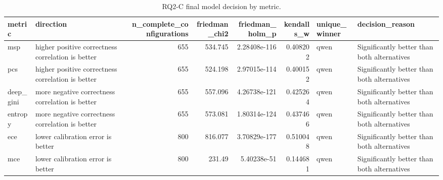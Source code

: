 \begin{table}[tbp]
\caption{RQ2-C final model decision by metric.}
\label{tab:rq2c-final-metric-decisions}
\begin{tabular}{llrrrrll}
\toprule
metric & direction & n\_complete\_configurations & friedman\_chi2 & friedman\_holm\_p & kendalls\_w & unique\_winner & decision\_reason \\
\midrule
msp & higher positive correctness correlation is better & 655 & 534.745 & 2.28408e-116 & 0.408202 & qwen & Significantly better than both alternatives \\
pcs & higher positive correctness correlation is better & 655 & 524.198 & 2.97015e-114 & 0.400152 & qwen & Significantly better than both alternatives \\
deep\_gini & more negative correctness correlation is better & 655 & 557.096 & 4.26738e-121 & 0.425264 & qwen & Significantly better than both alternatives \\
entropy & more negative correctness correlation is better & 655 & 573.081 & 1.80314e-124 & 0.437466 & qwen & Significantly better than both alternatives \\
ece & lower calibration error is better & 800 & 816.077 & 3.70829e-177 & 0.510048 & qwen & Significantly better than both alternatives \\
mce & lower calibration error is better & 800 & 231.49 & 5.40238e-51 & 0.144681 & qwen & Significantly better than both alternatives \\
\bottomrule
\end{tabular}
\end{table}
